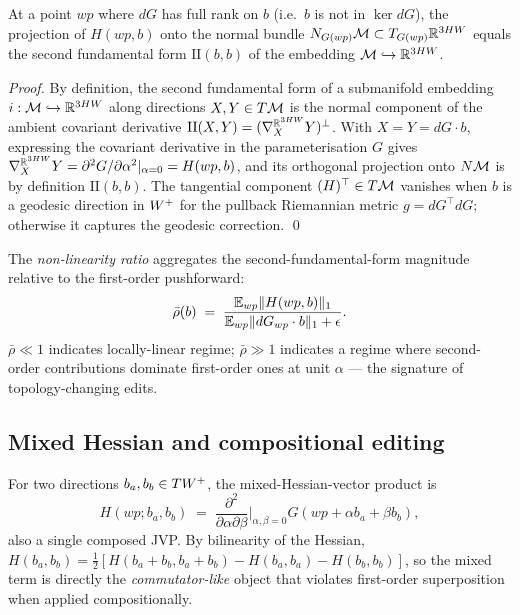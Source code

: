 \begin{proposition}
\label{prop:sff}
At a point $wp$ where $dG$ has full rank on $b$ (i.e.\ $b$ is not
in $\ker dG$), the projection of $H(wp, b)$ onto the normal bundle
$N_{G(wp)}\mathcal{M} \subset T_{G(wp)}\mathbb{R}^{3HW}$ equals the second
fundamental form $\mathrm{II}(b, b)$ of the embedding
$\mathcal{M} \hookrightarrow \mathbb{R}^{3HW}$.
\end{proposition}
\begin{proof}
By definition, the second fundamental form of a submanifold
embedding $i:\mathcal{M} \hookrightarrow \mathbb{R}^{3HW}$ along directions
$X, Y \in T\mathcal{M}$ is the normal component of the ambient covariant
derivative
$\mathrm{II}(X, Y) = (\nabla^{\mathbb{R}^{3HW}}_X Y)^\perp$.
With $X = Y = dG\cdot b$, expressing the covariant derivative
in the parameterisation $G$ gives
$\nabla^{\mathbb{R}^{3HW}}_X Y = \partial^2 G/\partial \alpha^2 |_{\alpha=0}
= H(wp, b)$,
and its orthogonal projection onto $N\mathcal{M}$ is by definition
$\mathrm{II}(b, b)$. The tangential component
$(H)^\top \in T\mathcal{M}$ vanishes when $b$ is a geodesic direction in
$W^+$ for the pullback Riemannian metric $g = dG^\top dG$; otherwise
it captures the geodesic correction.
\qed
\end{proof}

The \emph{non-linearity ratio} aggregates the second-fundamental-form
magnitude relative to the first-order pushforward:
\begin{equation}
  \bar\rho(b) \;=\;
  \frac{\mathbb{E}_{wp}\|H(wp, b)\|_1}{\mathbb{E}_{wp}\|dG_{wp}\cdot b\|_1 + \epsilon}.
\end{equation}
$\bar\rho \ll 1$ indicates locally-linear regime;
$\bar\rho \gg 1$ indicates a regime where second-order
contributions dominate first-order ones at unit $\alpha$ --- the
signature of topology-changing edits.

\subsection{Mixed Hessian and compositional editing}
For two directions $b_a, b_b \in TW^+$, the mixed-Hessian-vector
product is
\begin{equation}
  H(wp; b_a, b_b) \;=\;
  \frac{\partial^2}{\partial\alpha\partial\beta}\Big|_{\alpha,\beta=0}
  G(wp + \alpha b_a + \beta b_b),
\end{equation}
also a single composed JVP. By bilinearity of the Hessian,
$H(b_a, b_b) = \tfrac12 [H(b_a + b_b, b_a + b_b) - H(b_a, b_a)
- H(b_b, b_b)]$, so the mixed term is directly the
\emph{commutator-like} object that violates first-order
superposition when applied compositionally.

